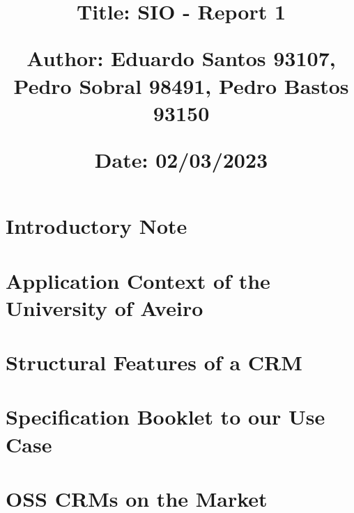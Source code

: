 \documentclass{article}
\begin{document}
\title{\vspace{-0.9cm}
       \vspace{1cm}
       \normalsize
       \raggedright\textbf{Title: \hspace{1.5cm} SIO - Report 1} \\ \vspace{0.4cm}
       \raggedright\textbf{Author: \hspace{1.12cm} Eduardo Santos 93107, Pedro Sobral 98491, Pedro Bastos 93150} \\ \vspace{0.4cm}
       \raggedright\textbf{Date: \hspace{1.48cm} 02/03/2023} \\}
\author{}
\date{}

\maketitle
\thispagestyle{fancy}


\vspace{-1.4cm}

\tableofcontents


\fontsize{10pt}{13pt}
\selectfont
\lsstyle



\section{Introductory Note}

\section{Application Context of the University of Aveiro}

\section{Structural Features of a CRM}

\section{Specification Booklet to our Use Case}

\section{OSS CRMs on the Market}
\end{document}

